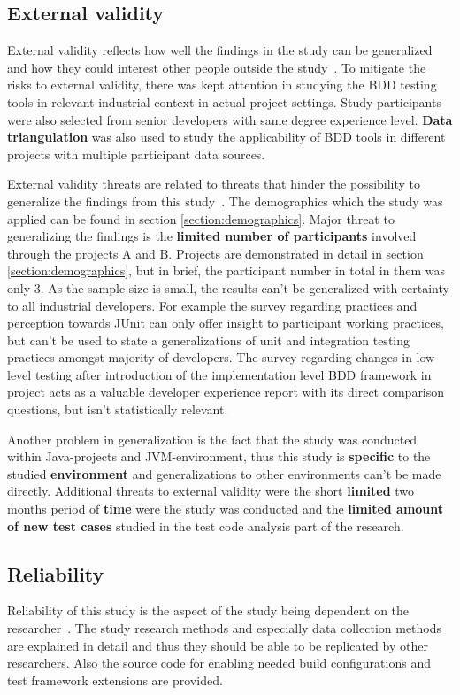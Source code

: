 \subsection{External validity}
External validity reflects how well the findings in the study can be generalized and how they could interest other people
outside the study~\cite{runeson2012case}. To mitigate the risks to external validity, there was kept attention in
studying the BDD testing tools in relevant industrial context in actual project settings. Study participants were also selected from senior
developers with same degree experience level. \textbf{Data triangulation} was also used to study the applicability of BDD
tools in different projects with multiple participant data sources.

External validity threats are related to threats that hinder the possibility to generalize the findings from this study~\cite{runeson2012case}.
The demographics which the study was applied can be found in section \ref{section:demographics}. Major threat to generalizing the findings
is the \textbf{limited number of participants} involved through the projects A and B. Projects are demonstrated in detail in section \ref{section:demographics},
but in brief, the participant number in total in them was only 3. As the sample size is small, the results can't be generalized
with certainty to all industrial developers. For example the survey regarding practices and perception towards JUnit can
only offer insight to participant working practices, but can't be used to state a generalizations of unit and integration
testing practices amongst majority of developers.
The survey regarding changes in low-level testing after introduction of the implementation level BDD framework in project acts
as a valuable developer experience report with its direct comparison questions, but isn't statistically relevant.

Another problem in generalization is the fact that the study was conducted within Java-projects and JVM-environment, thus this
study is \textbf{specific} to the studied \textbf{environment} and generalizations to other environments can't be made directly.
Additional threats to external validity were the short
\textbf{limited} two months period of \textbf{time} were the study was conducted and the \textbf{limited amount of new test cases} studied
in the test code analysis part of the research.

\subsection{Reliability}
Reliability of this study is the aspect of the study being dependent on the researcher~\cite{runeson2012case}. The study
research methods and especially data collection methods are explained in detail and thus they should be able to be replicated by other researchers.
Also the source code for enabling needed build configurations and test framework extensions are provided.

